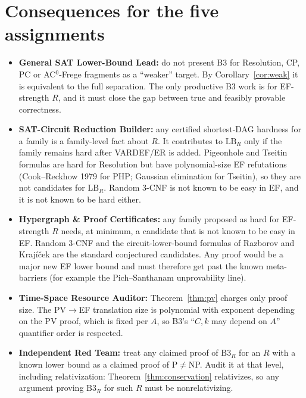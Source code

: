 \documentclass[11pt]{article}
\theoremstyle{definition}
\begin{document}
\section{Consequences for the five assignments}
\begin{itemize}
\item \textbf{General SAT Lower-Bound Lead:} do not present B3 for Resolution, CP, PC or AC$^0$-Frege fragments as a ``weaker'' target.
By Corollary~\ref{cor:weak} it is equivalent to the full separation.
The only productive B3 work is for EF-strength $R$, and it must close the gap between true and feasibly provable correctness.
\item \textbf{SAT-Circuit Reduction Builder:} any certified shortest-DAG hardness for a family is a family-level fact about $R$.
It contributes to $\mathrm{LB}_R$ only if the family remains hard after VARDEF/ER is added.
Pigeonhole and Tseitin formulas are hard for Resolution but have polynomial-size EF refutations (Cook--Reckhow 1979 for PHP; Gaussian elimination for Tseitin), so they are not candidates for $\mathrm{LB}_R$.
Random 3-CNF is not known to be easy in EF, and it is not known to be hard either.
\item \textbf{Hypergraph \& Proof Certificates:} any family proposed as hard for EF-strength $R$ needs, at minimum, a candidate that is not known to be easy in EF.
Random 3-CNF and the circuit-lower-bound formulas of Razborov and Krajíček are the standard conjectured candidates.
Any proof would be a major new EF lower bound and must therefore get past the known meta-barriers (for example the Pich--Santhanam unprovability line).
\item \textbf{Time-Space Resource Auditor:} Theorem~\ref{thm:pv} charges only proof size.
The $\mathrm{PV}\to$EF translation size is polynomial with exponent depending on the $\mathrm{PV}$ proof, which is fixed per $A$, so B3's ``$C,k$ may depend on $A$'' quantifier order is respected.
\item \textbf{Independent Red Team:} treat any claimed proof of $\mathrm{B3}_R$ for an $R$ with a known lower bound as a claimed proof of P$\neq$NP.
Audit it at that level, including relativization: Theorem~\ref{thm:conservation} relativizes, so any argument proving $\mathrm{B3}_R$ for such $R$ must be nonrelativizing.
\end{itemize}
\end{document}
